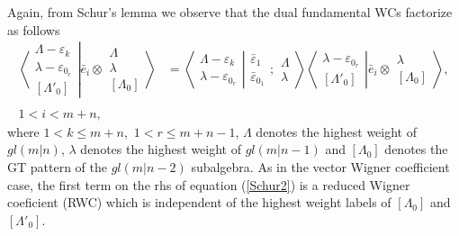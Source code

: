 \documentclass[12pt]{article}
\def\nn{\nonumber}
\begin{document}
Again, from Schur's lemma we observe that the dual fundamental WCs factorize as follows
\begin{align}
\left\langle\left. 
\begin{array}{c} \Lambda-\varepsilon_k\\ \lambda-\varepsilon_{0_r} \\ {[\Lambda'_0]} \end{array}
\right|\right.
\left.
\bar{e}_i\otimes \begin{array}{c} \Lambda \\ \lambda \\
{[\Lambda_0]} \end{array}
\right\rangle &= 
\left\langle\left. 
\begin{array}{c} \Lambda-\varepsilon_k\\ \lambda-\varepsilon_{0_r} 
 \end{array}
\right|\right.
\left.
\begin{array}{c} \bar{\varepsilon}_1 \\ \bar{\varepsilon}_{0_1} 
 \end{array}
; \begin{array}{c} \Lambda \\ \lambda
 \end{array}
\right\rangle 
\left\langle\left. 
\begin{array}{c} \lambda-\varepsilon_{0_r} \\ {[\Lambda'_0]} \end{array}
\right|\right.
\left.
\bar{e}_i\otimes \begin{array}{c} \lambda \\
{[\Lambda_0]} \end{array}
\right\rangle,\label{Schur2}\\
~~\nn\\
1 < i < m+n, \nn
\end{align}
where $1 < k \leq m+n$,~$1 < r \leq m+n-1$, 
$\Lambda$ denotes the highest weight of $gl(m|n)$, $\lambda$ denotes the highest weight of $gl(m|n-1)$ and $[\Lambda_0]$ denotes the GT pattern of the $gl(m|n-2)$ subalgebra. As in the vector Wigner coefficient case, the first term on the rhs of equation (\ref{Schur2}) is a reduced Wigner coeficient (RWC) which is independent of the highest
weight labels of $[\Lambda_0]$ and $[\Lambda'_0]$.
\end{document}

